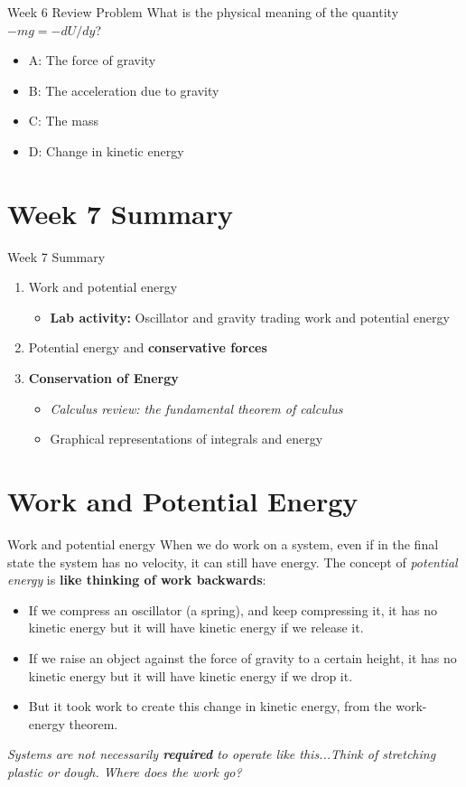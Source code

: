 \documentclass{beamer}
\begin{document}
\begin{frame}{Week 6 Review Problem}
What is the physical meaning of the quantity $-mg =-dU/dy$?
\begin{itemize}
\item A: The force of gravity 
\item B: The acceleration due to gravity
\item C: The mass
\item D: Change in kinetic energy
\end{itemize}
\end{frame}

\section{Week 7 Summary}

\begin{frame}{Week 7 Summary}
\begin{enumerate}
\item \alert{Work} and \alert{potential energy}
\begin{itemize}
\item \textbf{Lab activity:} Oscillator and gravity trading work and potential energy
\end{itemize}
\item Potential energy and \textbf{conservative forces}
\item \alert{\textbf{Conservation of Energy}}
\begin{itemize}
\item \textit{Calculus review: the fundamental theorem of calculus}
\item Graphical representations of integrals and energy
\end{itemize}
\end{enumerate}
\end{frame}

\section{Work and Potential Energy}

\begin{frame}{Work and potential energy}
When we do work on a system, even if in the final state the system has no velocity, it can still have energy.  The concept of \textit{potential energy} is \textbf{like thinking of work backwards}:
\begin{itemize}
\item If we compress an oscillator (a spring), and keep compressing it, it has no kinetic energy but it will have kinetic energy if we release it.
\item If we raise an object against the force of gravity to a certain height, it has no kinetic energy but it will have kinetic energy if we drop it.
\item \alert{But it took work to create this change in kinetic energy, from the work-energy theorem.} 
\end{itemize}
\textit{Systems are not necessarily \textbf{required} to operate like this...Think of stretching plastic or dough.  Where does the work go?}
\end{frame}
\end{document}
